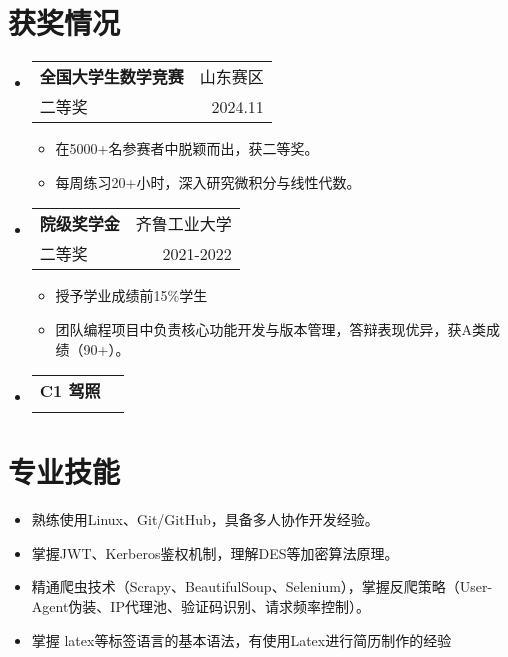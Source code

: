 \documentclass[a4paper,11pt]{ctexart}
\makeatletter
\newenvironment{resumeList}{\begin{itemize}[leftmargin=*,label={}]}{\end{itemize}}
\newcommand{\resumeItem}[1]{\item\small{#1}}
\newcommand{\resumeEntry}[4]{
  \item \begin{tabular*}{0.97\textwidth}[t]{l@{\extracolsep{\fill}}r}
    \textbf{#1} & #2 \\
    #3 & #4 \\
  \end{tabular*}
}
\makeatother
\begin{document}
\section{获奖情况}
\begin{resumeList}
    \resumeEntry{全国大学生数学竞赛}{山东赛区}{二等奖}{2024.11}
    \begin{resumeList}
        \resumeItem{在5000+名参赛者中脱颖而出，获二等奖。}
        \resumeItem{每周练习20+小时，深入研究微积分与线性代数。}
    \end{resumeList}
    \resumeEntry{院级奖学金}{齐鲁工业大学}{二等奖}{2021-2022}
    \begin{resumeList}
        \resumeItem{授予学业成绩前15\%学生}
        \resumeItem{团队编程项目中负责核心功能开发与版本管理，答辩表现优异，获A类成绩（90+）。}
    \end{resumeList}
    \resumeEntry{C1 驾照}{}{}{}
\end{resumeList}

\section{专业技能}
\begin{resumeList}
    \resumeItem{熟练使用Linux、Git/GitHub，具备多人协作开发经验。}
    \resumeItem{掌握JWT、Kerberos鉴权机制，理解DES等加密算法原理。}
    \resumeItem{精通爬虫技术（Scrapy、BeautifulSoup、Selenium），掌握反爬策略（User-Agent伪装、IP代理池、验证码识别、请求频率控制）。}
    \resumeItem{掌握 latex等标签语言的基本语法，有使用Latex进行简历制作的经验}
\end{resumeList}
\end{document}
